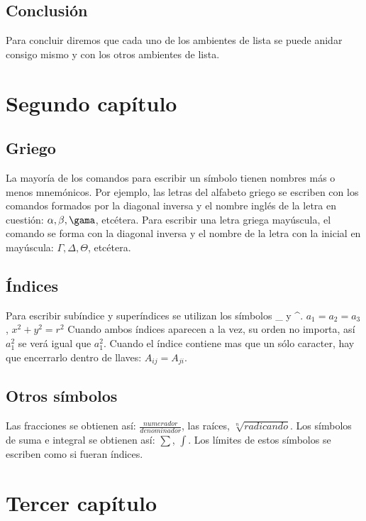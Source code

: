 \documentclass[12pt]{book} %
\begin{document}
\section{Conclusi\'on}
Para concluir diremos que  cada uno de los ambientes de lista se 
puede anidar consigo mismo y con los otros ambientes de lista.


 
\chapter{Segundo cap\'itulo}
\section{Griego}
La mayor\'ia de los comandos para escribir un s\'imbolo tienen 
nombres m\'as o menos mnem\'onicos. Por ejemplo, las letras del 
alfabeto griego se escriben con los comandos formados por la 
diagonal inversa y el nombre ingl\'es de la letra en cuesti\'on:
$\alpha, \beta, \gama$, etc\'etera. Para escribir una  letra griega  
may\'uscula, el comando se forma con la diagonal inversa y el 
nombre de la letra con la inicial en may\'uscula: $\Gamma, \Delta, 
\Theta$, etc\'etera.

\section{\'Indices}

Para escribir sub\'indice y super\'indices se utilizan los s\'imbolos
\_ y \^{}.  $a_1 = a_2 = a_3$, $x^2 + y^2 = r^2$ Cuando ambos 
\'indices aparecen a la  vez, su orden no importa, as\'i $a_1^2$ se 
ver\'a igual que $a^2_1$. Cuando el \'indice contiene mas que un 
s\'olo caracter, hay que encerrarlo dentro de llaves:
$A_{ij}= A_{ji}$.

\section{Otros s\'imbolos}
Las fracciones se obtienen as\'i: $\frac{numerador}{denominador}$, 
las ra\'ices,  $\sqrt[n]{radicando}$. Los s\'imbolos de suma e 
integral se obtienen as\'i: $\sum$, $\int$. Los l\'imites de estos 
s\'imbolos se escriben como si fueran \'indices. 

\chapter{Tercer cap\'itulo}
\end{document}
